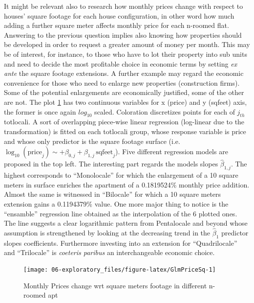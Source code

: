 \documentclass[
  12pt,
  a4paper,
  oneside]{book}
\theoremstyle{definition}
\theoremstyle{definition}
\theoremstyle{definition}
\theoremstyle{remark}
\begin{document}
It might be relevant also to research how monthly prices change with respect to houses' square footage for each house configuration, in other word how much adding a further square meter affects monthly price for each n-roomed flat.
Answering to the previous question implies also knowing how properties should be developed in order to request a greater amount of money per month. This may be of interest, for instance, to those who have to lot their property into sub units and need to decide the most profitable choice in economic terms by setting \emph{ex ante} the square footage extensions.
A further example may regard the economic convenience for those who need to enlarge new properties (construction firms). Some of the potential enlargements are economically justified, some of the other are not.
The plot \ref{fig:GlmPriceSq} has two continuous variables for x (price) and y (sqfeet) axis, the former is once again \(log_{10}\) scaled. Coloration discretizes points for each of \(j_{th}\) totlocali. A sort of overlapping piece-wise linear regression (log-linear due to the transformation) is fitted on each totlocali group, whose response variable is price and whose only predictor is the square footage surface (i.e.~\(\log_{10}(\text{price}_j) \sim +\beta_{0,j}+\beta_{1,j}\, \text{sqfeet}_j\)). Five different regression models are proposed in the top left. The interesting part regards the models slopes \(\hat\beta_{1,j}\). The highest corresponds to ``Monolocale'' for which the enlargement of a 10 square meters in surface enriches the apartment of a 0.1819524\% monthly price addition. Almost the same is witnessed in ``Bilocale'' for which a 10 square meters extension gains a 0.1194379\% value. One more major thing to notice is the ``ensamble'' regression line obtained as the interpolation of the 6 plotted ones. The line suggests a clear logarithmic pattern from Pentalocale and beyond whose assumption is strengthened by looking at the decreasing trend in the \(\hat\beta_1\) predictor slopes coefficients. Furthermore investing into an extension for ``Quadrilocale'' and ``Trilocale'' is \emph{coeteris paribus} an interchangeable economic choice.

\begin{figure}

{\centering \texttt{[image: 06-exploratory\_files/figure-latex/GlmPriceSq-1]} 

}

\caption{Monthly Prices change wrt square meters footage in different n-roomed apt}\label{fig:GlmPriceSq}
\end{figure}
\end{document}
